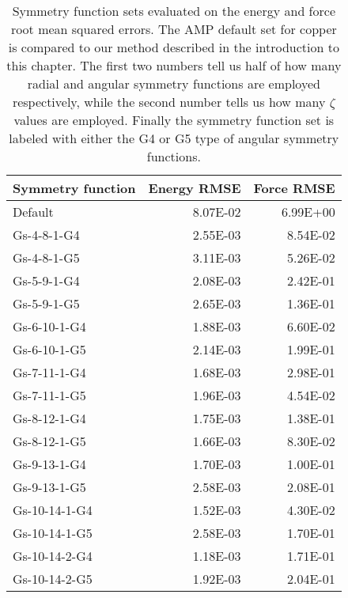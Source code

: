 \begin{table}[H]
\centering
\caption{Symmetry function sets evaluated on the energy and
    force root mean squared errors. The AMP default set for copper
    is compared to our method described in the introduction to this chapter.
    The first two numbers tell us half of how many radial and angular symmetry
    functions are employed respectively, while the second number tells us
    how many $\zeta$ values are employed.
    Finally the symmetry function
    set is labeled with either the G4 or G5 type 
    of angular symmetry functions.}
\label{table:symmetry}
\begin{tabular}{lrr}
\toprule
Symmetry function &  Energy RMSE &  Force RMSE \\
\midrule
          Default &     8.07E-02 &    6.99E+00 \\
      Gs-4-8-1-G4 &     2.55E-03 &    8.54E-02 \\
      Gs-4-8-1-G5 &     3.11E-03 &    5.26E-02 \\
      Gs-5-9-1-G4 &     2.08E-03 &    2.42E-01 \\
      Gs-5-9-1-G5 &     2.65E-03 &    1.36E-01 \\
     Gs-6-10-1-G4 &     1.88E-03 &    6.60E-02 \\
     Gs-6-10-1-G5 &     2.14E-03 &    1.99E-01 \\
     Gs-7-11-1-G4 &     1.68E-03 &    2.98E-01 \\
     Gs-7-11-1-G5 &     1.96E-03 &    4.54E-02 \\
     Gs-8-12-1-G4 &     1.75E-03 &    1.38E-01 \\
     Gs-8-12-1-G5 &     1.66E-03 &    8.30E-02 \\
     Gs-9-13-1-G4 &     1.70E-03 &    1.00E-01 \\
     Gs-9-13-1-G5 &     2.58E-03 &    2.08E-01 \\
    Gs-10-14-1-G4 &     1.52E-03 &    4.30E-02 \\
    Gs-10-14-1-G5 &     2.58E-03 &    1.70E-01 \\
    Gs-10-14-2-G4 &     1.18E-03 &    1.71E-01 \\
    Gs-10-14-2-G5 &     1.92E-03 &    2.04E-01 \\
\bottomrule
\end{tabular}
\end{table}

